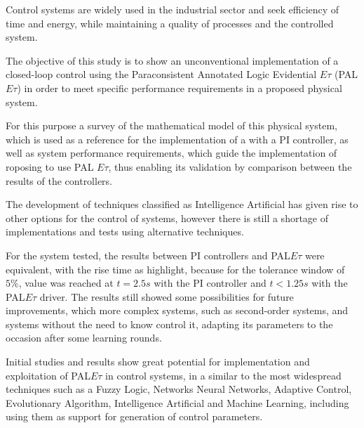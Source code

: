 





Control systems are widely used in the industrial sector and
seek efficiency of time and energy,
while maintaining a quality of processes and the controlled system.

The objective of this study is to show an unconventional implementation
of a closed-loop control using the Paraconsistent 
Annotated Logic Evidential $E\tau$ (PAL $E\tau$)
in order to meet specific performance requirements in a proposed physical system.

For this purpose a survey of the mathematical model of this
physical system, which is used as a reference for the implementation of a
with a PI controller,
as well as system performance requirements,
which guide the implementation of roposing to use PAL $E\tau$,
thus enabling its validation by comparison between the results of the controllers.

The development of techniques classified as Intelligence
Artificial has given rise to other options for the control of systems,
however there is still a shortage of implementations and tests using alternative techniques.

For the system tested, the results between PI controllers and
PAL$E\tau$ were equivalent, with the rise time as
highlight, because for the tolerance window of $5\%$,
value was reached at $ t = 2.5s $ with the PI controller and 
$ t < 1.25s$ with the PAL$E\tau$ driver. 
The results still showed some
possibilities for future improvements, which
more complex systems, such as second-order systems, and
systems without the need to know
control it, adapting its parameters to the occasion after some
learning rounds.

Initial studies and results show great potential for
implementation and exploitation of PAL$E\tau$ in control systems, in a
similar to the most widespread techniques such as a Fuzzy Logic, Networks
Neural Networks, Adaptive Control, Evolutionary Algorithm, Intelligence
Artificial and Machine Learning, including
using them as support for generation of control parameters.

